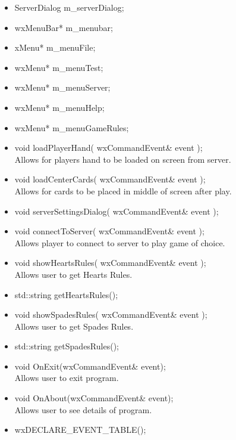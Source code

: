 \documentclass[]{scrartcl}
\begin{document}
\begin{itemize}
		\begin{itemize}
			\item ServerDialog m\_serverDialog;
			\item wxMenuBar* m\_menubar;
			\item xMenu* m\_menuFile;
			\item wxMenu* m\_menuTest;
			\item wxMenu* m\_menuServer;
			\item wxMenu* m\_menuHelp;
			\item wxMenu* m\_menuGameRules;
			\item void loadPlayerHand( wxCommandEvent\& event );
				\\Allows for players hand to be loaded on screen from server.
			\item void loadCenterCards( wxCommandEvent\& event );
				\\Allows for cards to be placed in middle of screen after play.
			\item void serverSettingsDialog( wxCommandEvent\& event );
			\item void connectToServer( wxCommandEvent\& event );
				\\Allows player to connect to server to play game of choice.
			\item void showHeartsRules( wxCommandEvent\& event );
				\\Allows user to get Hearts Rules.
			\item std::string getHeartsRules();
			\item void showSpadesRules( wxCommandEvent\& event );
				\\Allows user to get Spades Rules.
			\item std::string getSpadesRules();
			\item void OnExit(wxCommandEvent\& event);
				\\Allows user to exit program.
			\item void OnAbout(wxCommandEvent\& event);
				\\Allows user to see details of program.
			\item wxDECLARE\_EVENT\_TABLE();
		\end{itemize}
	\end{itemize}
\end{document}
